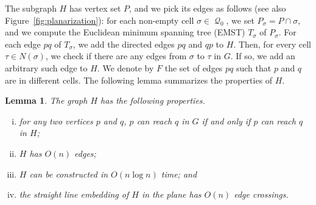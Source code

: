 \documentclass[11pt,a4paper]{paper}
\newtheorem{lemma}[theorem]{Lemma}
\DeclareMathOperator{\Q}{\mathcal{Q}}
\begin{document}
The subgraph $H$ has vertex set $P$, and we pick its edges as follows (see also
Figure~\ref{fig:planarization}):
for each non-empty cell $\sigma \in \Q_{0}$, we
set $P_\sigma = P \cap \sigma$, and
we compute the
Euclidean minimum spanning tree (EMST) $T_\sigma$ of $P_\sigma$.
For each edge $pq$ of $T_\sigma$, we add the directed edges
$pq$ and $qp$ to $H$.
Then, for every cell
$\tau \in N(\sigma)$,
we check if there are any edges from $\sigma$ to $\tau$ in $G$. If so, we
add an arbitrary such edge to $H$. We denote by
 $F$ the set of edges $pq$ such that $p$ and $q$ are in different cells.
The following lemma summarizes the properties of
$H$.

\begin{lemma}
\label{lem:pruning}
The graph $H$ has the following properties.
\begin{enumerate}[(i)]
\item for any two vertices $p$ and $q$, $p$ can reach $q$ in $G$ if and only if $p$ can reach $q$ in $H$;
\item $H$ has $O(n)$ edges;
\item $H$ can be constructed in $O(n \log n)$ time;
and
\item the straight line embedding of $H$ in the plane
has $O(n)$ edge crossings.
\end{enumerate}
\end{lemma}
\end{document}
